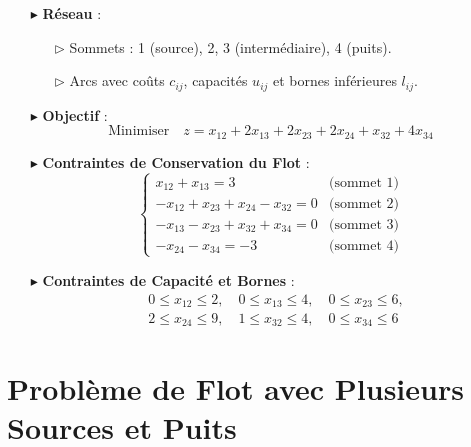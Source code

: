 \documentclass{report}
\begin{document}
\begin{multicols*}{2}
\begin{tikzpicture}[scale=1.1]
\end{tikzpicture}
\begin{itemize}
    \item[$\blacktriangleright$] \textbf{Réseau} :
    \begin{itemize}
        \item[$\rhd$] Sommets : 1 (source), 2, 3 (intermédiaire), 4 (puits).
        \item[$\rhd$] Arcs avec coûts \( c_{ij} \), capacités \( u_{ij} \) et bornes inférieures \( l_{ij} \).
    \end{itemize}
    \item[$\blacktriangleright$] \textbf{Objectif} :
    \[
    \text{Minimiser} \quad z = x_{12} + 2x_{13} + 2x_{23} + 2x_{24} + x_{32} + 4x_{34}
    \]
    \item[$\blacktriangleright$] \textbf{Contraintes de Conservation du Flot} :
    \[
    \begin{cases}
    x_{12} + x_{13} = 3 & \text{(sommet 1)} \\
    -x_{12} + x_{23} + x_{24} - x_{32} = 0 & \text{(sommet 2)} \\
    -x_{13} - x_{23} + x_{32} + x_{34} = 0 & \text{(sommet 3)} \\
    -x_{24} - x_{34} = -3 & \text{(sommet 4)}
    \end{cases}
    \]
    \item[$\blacktriangleright$] \textbf{Contraintes de Capacité et Bornes} :
    \[
    \begin{aligned}
    & 0 \leq x_{12} \leq 2, \quad 0 \leq x_{13} \leq 4, \quad 0 \leq x_{23} \leq 6, \\
    & 2 \leq x_{24} \leq 9, \quad 1 \leq x_{32} \leq 4, \quad 0 \leq x_{34} \leq 6
    \end{aligned}
    \]
\end{itemize}

\section{Problème de Flot avec Plusieurs Sources et Puits}


\end{multicols*}
\end{document}
